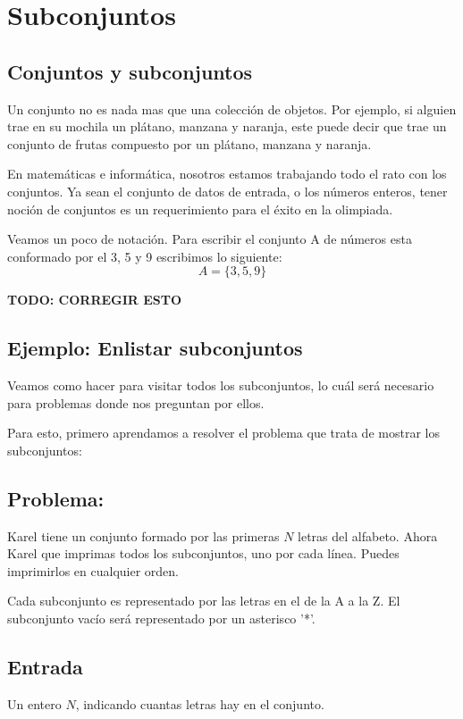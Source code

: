 \section{Subconjuntos}

\subsection{Conjuntos y subconjuntos}

Un conjunto no es nada mas que una colección de objetos. Por ejemplo, si alguien trae en su mochila un plátano, manzana y naranja, este puede decir que trae un conjunto de frutas compuesto por un plátano, manzana y naranja.

En matemáticas e informática, nosotros estamos trabajando todo el rato con los conjuntos. Ya sean el conjunto de datos de entrada, o los números enteros, tener noción de conjuntos es un requerimiento para el éxito en la olimpiada.

Veamos un poco de notación. Para escribir el conjunto A de números esta conformado por el 3, 5 y 9 escribimos lo siguiente:
\[A=\{3,5,9\}\]

\begin{center}
	\textbf{TODO: CORREGIR ESTO}
\end{center}
\pagebreak

\subsection*{Ejemplo: Enlistar subconjuntos}
Veamos como hacer para visitar todos los subconjuntos, lo cuál será necesario para problemas donde nos preguntan por ellos.

Para esto, primero aprendamos a resolver el problema que trata de mostrar los subconjuntos:

\subsection*{Problema:}

Karel tiene un conjunto formado por las primeras \(N\) letras del alfabeto. Ahora Karel que imprimas todos los subconjuntos, uno por cada línea. Puedes imprimirlos en cualquier orden.

Cada subconjunto es representado por las letras en el de la A a la Z. El subconjunto vacío será representado por un asterisco '*'.
\subsection*{Entrada}
Un entero \(N\), indicando cuantas letras hay en el conjunto.
